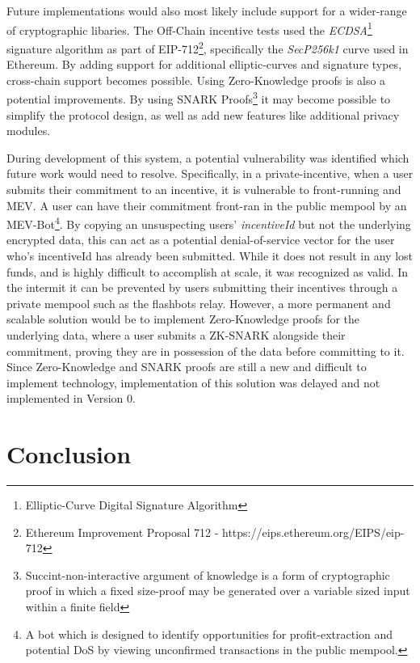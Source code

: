 \documentclass{article}
\begin{document}
Future implementations would also most likely include support for a wider-range of cryptographic libaries. The Off-Chain incentive tests used the \emph{ECDSA}\footnote{Elliptic-Curve Digital Signature Algorithm} signature algorithm as part of EIP-712\footnote{Ethereum Improvement Proposal 712 - https://eips.ethereum.org/EIPS/eip-712}, specifically the \emph{SecP256k1} curve used in Ethereum. By adding support for additional elliptic-curves and signature types, cross-chain support becomes possible. Using Zero-Knowledge proofs is also a potential improvements. By using SNARK Proofs\footnote{Succint-non-interactive argument of knowledge is a form of cryptographic proof in which a fixed size-proof may be generated over a variable sized input within a finite field} it may become possible to simplify the protocol design, as well as add new features like additional privacy modules. 

During development of this system, a potential vulnerability was identified which future work would need to resolve. Specifically, in a private-incentive, when a user submits their commitment to an incentive, it is vulnerable to front-running and MEV. A user can have their commitment front-ran in the public mempool by an MEV-Bot\footnote{A bot which is designed to identify opportunities for profit-extraction and potential DoS by viewing unconfirmed transactions in the public mempool.}. By copying an unsuspecting users' \emph{incentiveId} but not the underlying encrypted data, this can act as a potential denial-of-service vector for the user who's incentiveId has already been submitted. While it does not result in any lost funds, and is highly difficult to accomplish at scale, it was recognized as valid. In the intermit it can be prevented by users submitting their incentives through a private mempool such as the flashbots relay. However, a more permanent and scalable solution would be to implement Zero-Knowledge proofs for the underlying data, where a user submits a ZK-SNARK alongside their commitment, proving they are in possession of the data before committing to it. Since Zero-Knowledge and SNARK proofs are still a new and difficult to implement technology, implementation of this solution was delayed and not implemented in Version 0.

\section{Conclusion}
\end{document}
